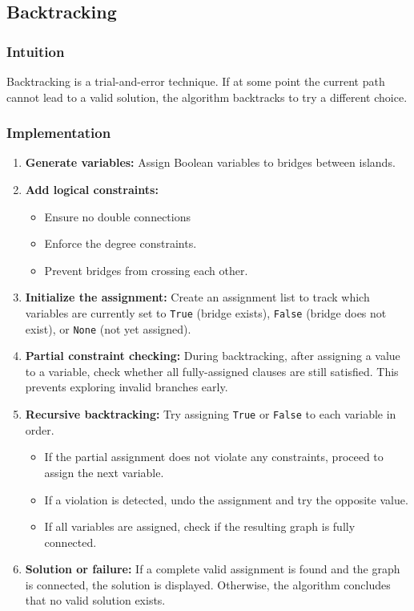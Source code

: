 \subsection{Backtracking}

\subsubsection{Intuition}
Backtracking is a trial-and-error technique. If at some point the current path cannot lead to a valid solution, the algorithm backtracks to try a different choice.

\subsubsection{Implementation}
\begin{enumerate}
  \item \textbf{Generate variables:} Assign Boolean variables to bridges between islands.

  \item \textbf{Add logical constraints:}
  \begin{itemize}
    \item Ensure no double connections 
    \item Enforce the degree constraints.
    \item Prevent bridges from crossing each other.
  \end{itemize}

  \item \textbf{Initialize the assignment:} 
  Create an assignment list to track which variables are currently set to \texttt{True} (bridge exists), \texttt{False} (bridge does not exist), or \texttt{None} (not yet assigned).

  \item \textbf{Partial constraint checking:} 
  During backtracking, after assigning a value to a variable, check whether all fully-assigned clauses are still satisfied. This prevents exploring invalid branches early.

  \item \textbf{Recursive backtracking:}
  Try assigning \texttt{True} or \texttt{False} to each variable in order.
  \begin{itemize}
    \item If the partial assignment does not violate any constraints, proceed to assign the next variable.
    \item If a violation is detected, undo the assignment and try the opposite value.
    \item If all variables are assigned, check if the resulting graph is fully connected.
  \end{itemize}

  \item \textbf{Solution or failure:}
  If a complete valid assignment is found and the graph is connected, the solution is displayed.
  Otherwise, the algorithm concludes that no valid solution exists.
\end{enumerate}